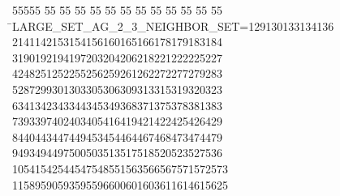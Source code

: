 %
%
\begin{tabbing}
55555 \= 55 \= 55 \= 55 \= 55 \= 55 \= 55 \= 55 \= 55 \= 55 \= 55 \= 55 \= 55 \= \>LARGE\_SET\_AG\_2\_3\_NEIGHBOR\_SET=129130133134136\\[0pt]
2141142153154156160165166178179183184\\[0pt]
3190192194197203204206218221222225227\\[0pt]
4248251252255256259261262272277279283\\[0pt]
5287299301303305306309313315319320323\\[0pt]
6341342343344345349368371375378381383\\[0pt]
7393397402403405416419421422425426429\\[0pt]
8440443447449453454464467468473474479\\[0pt]
9493494497500503513517518520523527536\\[0pt]
10541542544547548551563566567571572573\\[0pt]
11589590593595596600601603611614615625\\[0pt]

\end{tabbing}

